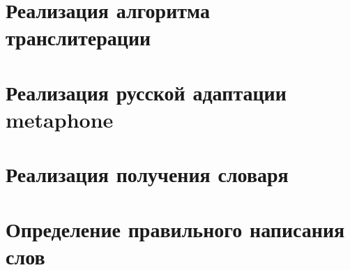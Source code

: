 \appendix

\section{Реализация алгоритма транслитерации}\label{sec:a}



\section{Реализация русской адаптации metaphone}\label{sec:b}





\section{Реализация получения словаря}\label{sec:c}



\section{Определение правильного написания слов}\label{sec:d}




